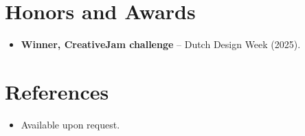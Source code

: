 \documentclass[11pt,a4paper,sans]{moderncv}
\begin{document}

\section{Honors and Awards}
\vspace{1pt}
\begin{itemize}
\item{\textbf{Winner, CreativeJam challenge} -- Dutch Design Week (2025).}
\end{itemize}


\section{References}
\vspace{1pt}
\begin{itemize}
\item{Available upon request.}
\end{itemize}
\end{document}
